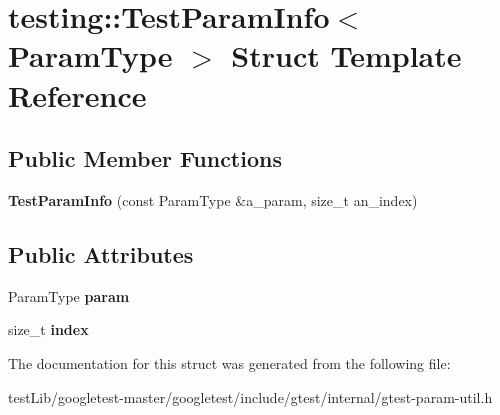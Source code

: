 \hypertarget{structtesting_1_1TestParamInfo}{}\section{testing\+:\+:Test\+Param\+Info$<$ Param\+Type $>$ Struct Template Reference}
\label{structtesting_1_1TestParamInfo}
\subsection*{Public Member Functions}
\begin{DoxyCompactItemize}
\item 
\mbox{\label{structtesting_1_1TestParamInfo_aa54199319bcad5a33c8538ecaecb6de5}} 
{\bfseries Test\+Param\+Info} (const Param\+Type \&a\+\_\+param, size\+\_\+t an\+\_\+index)
\end{DoxyCompactItemize}
\subsection*{Public Attributes}
\begin{DoxyCompactItemize}
\item 
\mbox{\label{structtesting_1_1TestParamInfo_a146d921039f9da8b1336f7cc6e8436c2}} 
Param\+Type {\bfseries param}
\item 
\mbox{\label{structtesting_1_1TestParamInfo_ad4d7bc02cbcc571eb3c1d2ec3ba5bb53}} 
size\+\_\+t {\bfseries index}
\end{DoxyCompactItemize}


The documentation for this struct was generated from the following file\+:\begin{DoxyCompactItemize}
\item 
test\+Lib/googletest-\/master/googletest/include/gtest/internal/gtest-\/param-\/util.\+h\end{DoxyCompactItemize}
